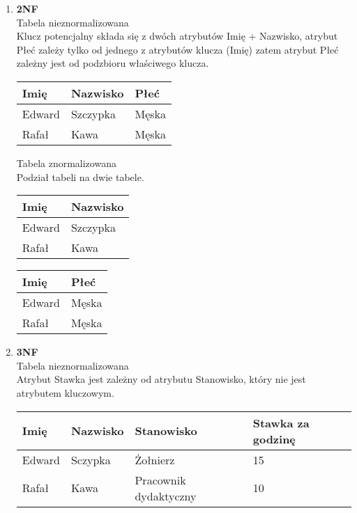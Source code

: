 \documentclass[main.tex]{subfiles}
\begin{document}
\begin{enumerate}
        \item \textbf{2NF}\\
        Tabela nieznormalizowana\\
        Klucz potencjalny składa się z dwóch atrybutów Imię + Nazwisko, atrybut Płeć zależy tylko od jednego z atrybutów klucza (Imię) zatem atrybut Płeć zależny jest od podzbioru właściwego klucza.
        \begin{table}[H]
            \begin{tabular}{|l|l|l|}
                \hline
                Imię & Nazwisko & Płeć  \\ \hline
                Edward & Szczypka & Męska \\ \hline
                Rafał & Kawa & Męska \\ \hline
            \end{tabular}
        \end{table}

        Tabela znormalizowana\\
        Podział tabeli na dwie tabele.

        \begin{table}[H]
            \begin{tabular}{|l|l|}
                \hline
                Imię & Nazwisko \\ \hline
                Edward & Szczypka \\ \hline
                Rafał & Kawa     \\ \hline
            \end{tabular}
        \end{table}

        \begin{table}[H]
            \begin{tabular}{|l|l|}
                \hline
                Imię & Płeć  \\ \hline
                Edward & Męska \\ \hline
                Rafał & Męska \\ \hline
            \end{tabular}
        \end{table}

        \item \textbf{3NF}\\
        Tabela nieznormalizowana\\
        Atrybut Stawka jest zależny od atrybutu Stanowisko, który nie jest atrybutem kluczowym.
        \begin{table}[H]
            \begin{tabular}{|l|l|l|l|}
                \hline
                Imię & Nazwisko & Stanowisko & Stawka za godzinę \\ \hline
                Edward & Sczypka & Żołnierz & 15                \\ \hline
                Rafał & Kawa & Pracownik dydaktyczny & 10                \\ \hline
            \end{tabular}
        \end{table}


\end{enumerate}
\end{document}
